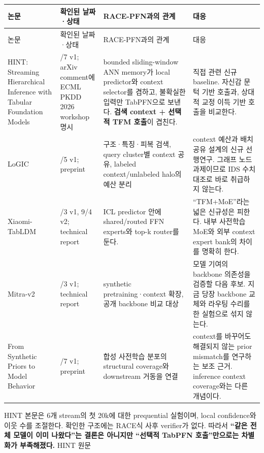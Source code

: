 \begingroup
\footnotesize
\begin{longtable}{>{\raggedright\arraybackslash}p{}>{\raggedright\arraybackslash}p{}>{\raggedright\arraybackslash}p{}>{\raggedright\arraybackslash}p{}}
\toprule
논문 & 확인된 날짜·상태 & RACE-PFN과의 관계 & 대응 \\ \midrule
\endfirsthead
논문 & 확인된 날짜·상태 & RACE-PFN과의 관계 & 대응 \\ \midrule
\endhead
{}HINT: Streaming Hierarchical Inference with Tabular Foundation Models & 9/\allowbreak{}7 v1; arXiv comment에 ECML PKDD 2026 workshop 명시 & bounded sliding-window ANN memory가 local predictor와 context selector를 겸하고, 불확실한 입력만 TabPFN으로 보낸다. \textbf{검색 context +\allowbreak{} 선택적 TFM 호출}이 겹친다. & 직접 관련 신규 baseline. 자신감 문턱 기반 호출과, 상대적 교정 이득 기반 호출을 비교한다. \\
{}LoGIC & 9/\allowbreak{}5 v1; preprint & 구조·특징·피복 검색, query cluster별 context 공유, labeled context/\allowbreak{}unlabeled halo의 예산 분리 & context 예산과 배치 공유 설계의 신규 선행연구. 그래프 노드 과제이므로 IDS 수치 대조로 바로 취급하지 않는다. \\
{}Xiaomi-TabLDM & 9/\allowbreak{}3 v1, 9/\allowbreak{}4 v2; technical report & ICL predictor 안에 shared/\allowbreak{}routed FFN experts와 top-k router를 둔다. & “TFM+\allowbreak{}MoE”라는 넓은 신규성은 피한다. 내부 사전학습 MoE와 외부 context expert bank의 차이를 명확히 한다. \\
{}Mitra-v2 & 9/\allowbreak{}3 v1; technical report & synthetic pretraining·context 확장, 공개 backbone 비교 대상 & 모델 기여의 backbone 의존성을 검증할 다음 후보. 지금 당장 backbone 교체와 라우팅 수리를 한 실험으로 섞지 않는다. \\
{}From Synthetic Priors to Model Behavior & 9/\allowbreak{}7 v1; preprint & 합성 사전학습 분포의 structural coverage와 downstream 거동을 연결 & context를 바꾸어도 해결되지 않는 prior mismatch를 연구하는 보조 근거. inference context coverage와는 다른 개념이다. \\
\bottomrule
\end{longtable}
\endgroup
HINT 본문은 6개 stream의 첫 20k에 대한 prequential 실험이며, local confidence와 이웃 수를 조절한다. 확인한 구조에는 RACE식 사후 verifier가 없다. 따라서 \textbf{“같은 전체 모델이 이미 나왔다”는 결론은 아니지만 “선택적 TabPFN 호출”만으로는 차별화가 부족해졌다.} HINT 원문

